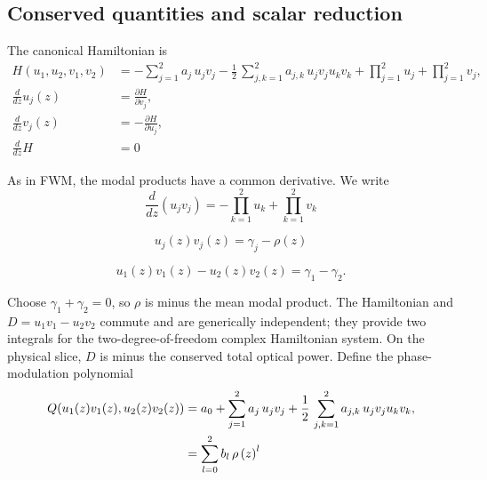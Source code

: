 \documentclass[11pt,a4paper]{article}
\numberwithin{equation}{section}
\begin{document}

\subsection{Conserved quantities and scalar reduction}
The canonical Hamiltonian is
\begin{align}
\label{cc:eq:ham-uv}
H(u_1, u_2, v_1, v_2) &= -\sum_{j=1}^{2} a_{j}\, u_j v_j - \frac{1}{2}\,\sum_{j,k=1}^{2} a_{j,k}\, u_j v_j u_k v_k + \prod\limits_{j=1}^{2} u_j + \prod\limits_{j=1}^{2} v_j, \\
\frac{d}{d z} u_j{\left(z \right)} &= \frac{\partial H}{\partial v_j}, \\
\frac{d}{d z} v_j{\left(z \right)} &= -\frac{\partial H}{\partial u_j}, \\
\frac{d}{d z} H &= 0
\end{align}

As in FWM, the modal products have a common derivative. We write
\begin{equation}
\label{cc:eq:duv_j} 
\frac{d}{d z}\left(u_j v_j\right) = - \prod\limits_{k=1}^{2} u_k + \prod\limits_{k=1}^{2} v_k
\end{equation}

\begin{equation}
\label{cc:eq:uvj-gam-rho}
u_j(z) v_j(z) = \gamma_j - \rho(z)
\end{equation}

\begin{equation}
\label{cc:eq:power-conserved}
u_1(z) v_1(z) - u_2(z) v_2(z) = \gamma_1 - \gamma_2.
\end{equation}

Choose $\gamma_1+\gamma_2=0$, so $\rho$ is minus the mean modal product.
The Hamiltonian and $D=u_1v_1-u_2v_2$ commute and are generically independent; they provide two integrals for the two-degree-of-freedom complex Hamiltonian system.
On the physical slice, $D$ is minus the conserved total optical power.
Define the phase-modulation polynomial
\begin{align}
Q(u_1(z)v_1(z), u_2(z)v_2(z)) &= a_0 + \sum_{j=1}^{2} a_{j}\, u_j v_j + \frac{1}{2}\,\sum_{j,k=1}^{2} a_{j,k}\, u_j v_j u_k v_k , \notag  \\
& = \sum_{l=0}^{2}b_l\,\rho\left(z\right)^l \label{cc:eq:Q-uv}
\end{align}
\end{document}
